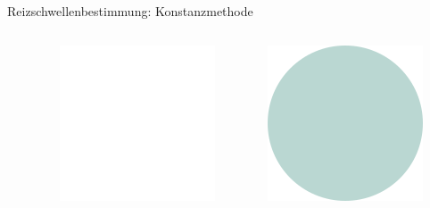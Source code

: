 \documentclass[aspectratio=169]{beamer}
\begin{document}
\begin{frame}{Reizschwellenbestimmung: Konstanzmethode}
\begin{columns}[c]
\begin{column}{1.5cm}
\end{column}
\begin{column}{1.5cm}
\includegraphics[width=\textwidth]{reizschwelle_seriell_1.png}
\end{column}
\begin{column}{1.5cm}
\includegraphics[width=\textwidth]{reizschwelle_seriell_10.png}

\end{column}
\end{columns}
\end{frame}
\end{document}
